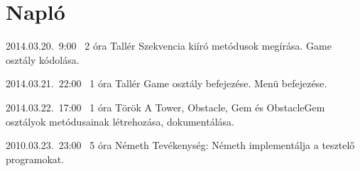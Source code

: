 %
\section{Napló}

\begin{naplo}

\bejegyzes
{2014.03.20.~9:00~} %
{2 óra} %
{Tallér} %
{Szekvencia kiíró metódusok megírása. Game osztály kódolása.}

\bejegyzes
{2014.03.21.~22:00~} %
{1 óra} %
{Tallér} %
{Game osztály befejezése. Menü befejezése.}

\bejegyzes
{2014.03.22.~17:00~} %
{1 óra} %
{Török} %
{A Tower, Obstacle, Gem és ObstacleGem osztályok metódusainak létrehozása, dokumentálása.}

\bejegyzes
{2010.03.23.~23:00~}
{5 óra}
{Németh}
{Tevékenység: Németh implementálja a tesztelő programokat.}


\end{naplo}

